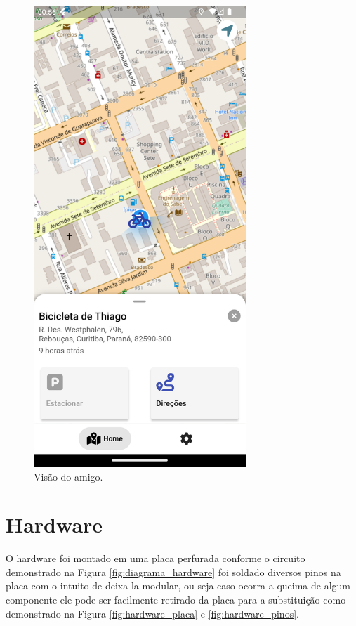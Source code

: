 \begin{figure}[!h]
\centering
\includegraphics[width=8cm]{capitulos/Figuras/app-buddy.png}
\caption{Visão do amigo.}
\label{fig:app-buddy}
\end{figure}

\section{Hardware}

    O hardware foi montado em uma placa perfurada conforme o circuito demonstrado na Figura \ref{fig:diagrama_hardware} foi soldado diversos pinos na placa com o intuito de deixa-la modular, ou seja caso ocorra a queima de algum componente ele pode ser facilmente retirado da placa para a substituição como demonstrado na Figura \ref{fig:hardware_placa} e \ref{fig:hardware_pinos}.
    
